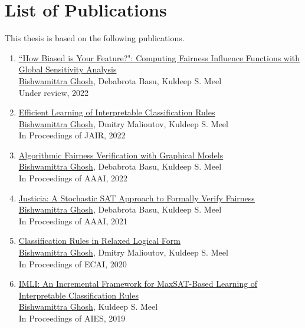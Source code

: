
\clearpage
\section*{List of Publications}
This thesis is based on the following publications.

\begin{enumerate}
	
	\item \href{https://arxiv.org/pdf/2206.00667.pdf}{``How Biased is Your Feature?": Computing Fairness Influence Functions with Global Sensitivity Analysis}\\
	\underline{Bishwamittra Ghosh}, Debabrota Basu, Kuldeep S. Meel\\
	Under review, 2022
	
	\item \href{https://arxiv.org/pdf/2205.06936.pdf}{Efficient Learning of Interpretable Classification Rules} \\
	\underline{Bishwamittra Ghosh}, Dmitry Malioutov, Kuldeep S. Meel\\
	In Proceedings of JAIR, 2022
	
	\item \href{https://arxiv.org/pdf/2109.09447.pdf}{Algorithmic Fairness Verification with Graphical Models} \\
	\underline{Bishwamittra Ghosh}, Debabrota Basu, Kuldeep S. Meel\\
	In Proceedings of AAAI, 2022
		
	\item \href{https://arxiv.org/pdf/2009.06516.pdf}{Justicia: A Stochastic SAT Approach to Formally Verify Fairness} \\
	\underline{Bishwamittra Ghosh}, Debabrota Basu, Kuldeep S. Meel\\
	In Proceedings of AAAI, 2021
	
	
	\item \href{https://bishwamittra.github.io/publication/ecai_2020/paper.pdf}{Classification Rules in Relaxed Logical Form
	} \\
	\underline{Bishwamittra Ghosh}, Dmitry Malioutov, Kuldeep S. Meel\\
	In Proceedings of ECAI, 2020
	
	\item \href{https://bishwamittra.github.io/publication/imli-ghosh.pdf}{IMLI: An Incremental Framework for MaxSAT-Based Learning of Interpretable Classification Rules}\\
	\underline{Bishwamittra Ghosh}, Kuldeep S. Meel\\
	In Proceedings of AIES, 2019
	
	
\end{enumerate}
\clearpage
